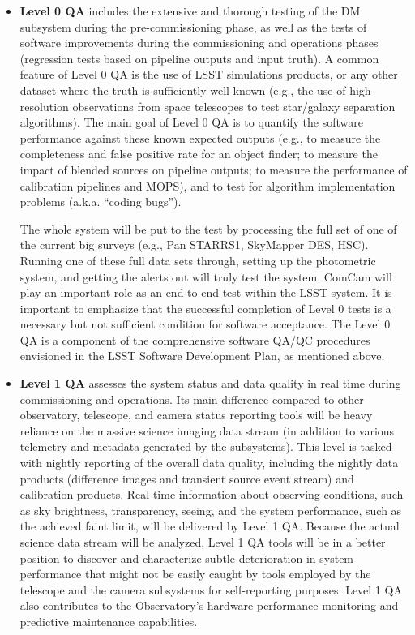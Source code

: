 \documentclass[SE,toc,lsstdraft]{lsstdoc}
\newcommand{\oldtext}[1]{{\color{red} #1}}
\newcommand{\newtext}[1]{{\color{blue} #1}}
\begin{document}
\begin{itemize}
\item \textbf{Level 0 QA} includes the extensive and thorough testing of the DM subsystem
during the pre-commissioning phase, as well as the tests of software improvements
during the commissioning and operations phases (regression tests based on pipeline
outputs and input truth). A common feature of Level 0 QA is
the use of LSST simulations products, or any other dataset where the truth is sufficiently
well known (e.g., the use of high-resolution observations from space telescopes to test
star/galaxy separation algorithms). The main goal of Level 0 QA is to quantify the
software performance against these known expected outputs (e.g., to measure the
completeness and false positive rate for an object finder; to measure the impact of
blended sources on pipeline outputs; to measure the performance of calibration pipelines
and MOPS), and to test for algorithm implementation problems (a.k.a. ``coding bugs'').

The whole system will be put to the test by processing the full set of one of the current big surveys (e.g., \oldtext{Pan STARRS1, SkyMapper} \newtext{DES, HSC}). Running one of these full data sets through, setting up the photometric system, and getting the alerts out will truly test the system.
\newtext{ComCam will play an important role as an end-to-end test within the LSST system.}
It is important to emphasize that the successful completion of Level 0 tests is a necessary
but not sufficient condition for software acceptance. The Level 0 QA is a component of the comprehensive software QA/QC procedures envisioned in the LSST Software Development Plan, as mentioned above.

\item \textbf{Level 1 QA} assesses the system status and data quality in real time during
commissioning and operations. Its
main difference compared to other observatory, telescope, and camera status reporting
tools will be heavy reliance on the massive science imaging data stream (in addition to various
telemetry and metadata generated by the subsystems). This level is tasked
with nightly reporting of the overall data quality, including the nightly data products
(difference images and transient source event stream) and calibration products.
Real-time information about observing conditions, such as sky brightness,
transparency, seeing, and the system performance, such as the achieved faint limit, will be delivered
by Level 1 QA. Because the actual science data stream will be analyzed, Level 1 QA tools will be
in a better position to discover and characterize subtle deterioration in system performance
that might not be easily caught by tools employed by the telescope
and the camera subsystems for self-reporting purposes. Level 1 QA also contributes to the Observatory's hardware performance monitoring and predictive maintenance capabilities.


\end{itemize}
\end{document}
